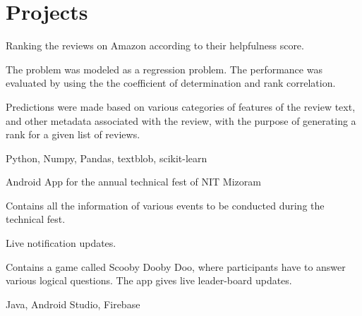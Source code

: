 
\section{Projects}

\begin{tightemize}
\item Ranking the reviews on Amazon according to their helpfulness score.
\item The problem was modeled as a regression problem. The performance was evaluated by using the the coefficient of determination and rank correlation.
\item Predictions were made based on various categories of features of the review text, and other metadata associated with the review, with the purpose of generating a rank for a given list of reviews.
\item {} Python, Numpy, Pandas, textblob, scikit-learn
\end{tightemize}
\sectionsep

\begin{tightemize}\item Android App for the annual technical fest of NIT Mizoram
\item Contains all the information of various events to be conducted during the technical fest.
\item Live notification updates.
\item Contains a game called Scooby Dooby Doo, where participants have to answer various logical questions. The app gives live leader-board updates.
\item {} Java, Android Studio, Firebase
\end{tightemize}
\sectionsep